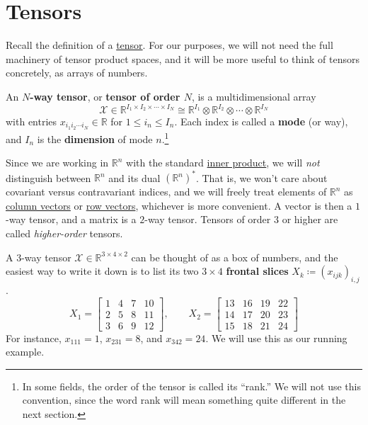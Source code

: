 \section{Tensors}

  \providecommand{\llbracket}{[\![}
  \providecommand{\rrbracket}{]\!]}

  Recall the definition of a \hyperref[lin-def:tensor]{tensor}. For our purposes, we will not need the full machinery of tensor product spaces, and it will be more useful to think of tensors concretely, as arrays of numbers.

  \begin{definition}[Tensor]
    \label{def:tensor}
    An \textbf{$N$-way tensor}, or \textbf{tensor of order $N$}, is a multidimensional array
    \begin{equation}
      \mathcal{X} \in \mathbb{R}^{I_1 \times I_2 \times \cdots \times I_N} \cong \mathbb{R}^{I_1} \otimes \mathbb{R}^{I_2} \otimes \cdots \otimes \mathbb{R}^{I_N}
    \end{equation}
    with entries $x_{i_1 i_2 \cdots i_N} \in \mathbb{R}$ for $1 \leq i_n \leq I_n$. Each index is called a \textbf{mode} (or way), and $I_n$ is the \textbf{dimension} of mode $n$.\footnote{In some fields, the order of the tensor is called its ``rank.'' We will not use this convention, since the word rank will mean something quite different in the next section.}
  \end{definition}

  Since we are working in $\mathbb{R}^n$ with the standard \hyperref[lin-def:inner-product]{inner product}, we will \textit{not} distinguish between $\mathbb{R}^n$ and its dual $(\mathbb{R}^n)^*$. That is, we won't care about covariant versus contravariant indices, and we will freely treat elements of $\mathbb{R}^n$ as \hyperref[lin-def:column-vector]{column vectors} or \hyperref[lin-def:row-vector]{row vectors}, whichever is more convenient. A vector is then a $1$-way tensor, and a matrix is a $2$-way tensor. Tensors of order $3$ or higher are called \textit{higher-order} tensors.

  \begin{example}[A $3$-Tensor]
    \label{ex:running}
    A $3$-way tensor $\mathcal{X} \in \mathbb{R}^{3 \times 4 \times 2}$ can be thought of as a box of numbers, and the easiest way to write it down is to list its two $3 \times 4$ \textbf{frontal slices} $X_k \coloneqq (x_{ijk})_{i,j}$.
    \begin{equation}
      X_1 = \begin{bmatrix} 1 & 4 & 7 & 10 \\ 2 & 5 & 8 & 11 \\ 3 & 6 & 9 & 12 \end{bmatrix}, \qquad
      X_2 = \begin{bmatrix} 13 & 16 & 19 & 22 \\ 14 & 17 & 20 & 23 \\ 15 & 18 & 21 & 24 \end{bmatrix}
    \end{equation}
    For instance, $x_{111} = 1$, $x_{231} = 8$, and $x_{342} = 24$. We will use this as our running example.
  \end{example}

